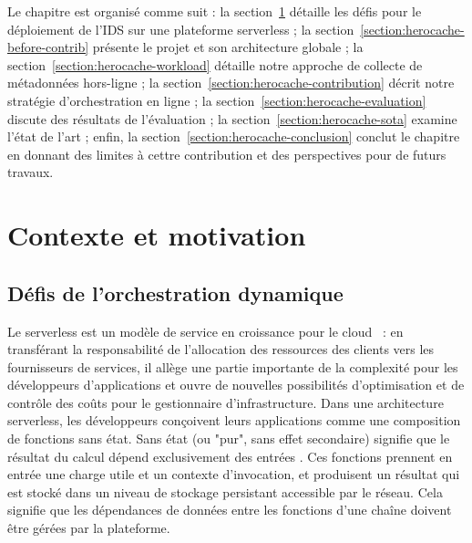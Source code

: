 Le chapitre est organisé comme suit : la section~\ref{section:herocache-background} détaille les défis pour le déploiement de l'IDS sur une plateforme serverless ; la section~\ref{section:herocache-before-contrib} présente le projet et son architecture globale ; la section~\ref{section:herocache-workload} détaille notre approche de collecte de métadonnées hors-ligne ; la section~\ref{section:herocache-contribution} décrit notre stratégie d'orchestration en ligne ; la section~\ref{section:herocache-evaluation} discute des résultats de l'évaluation ; la section~\ref{section:herocache-sota} examine l'état de l'art ; enfin, la section~\ref{section:herocache-conclusion} conclut le chapitre en donnant des limites à cettre contribution et des perspectives pour de futurs travaux.

\section{Contexte et motivation}
\label{section:herocache-background}

\subsection{Défis de l'orchestration dynamique}

Le serverless est un modèle de service en croissance pour le cloud~\cite{Lannurien2023} : en transférant la responsabilité de l'allocation des ressources des clients vers les fournisseurs de services, il allège une partie importante de la complexité pour les développeurs d'applications et ouvre de nouvelles possibilités d'optimisation et de contrôle des coûts pour le gestionnaire d'infrastructure. Dans une architecture serverless, les développeurs conçoivent leurs applications comme une composition de fonctions sans état. Sans état (ou "pur", sans effet secondaire) signifie que le résultat du calcul dépend exclusivement des entrées \cite{burckhardtNetheriteEfficientExecution}. Ces fonctions prennent en entrée une charge utile et un contexte d'invocation, et produisent un résultat qui est stocké dans un niveau de stockage persistant accessible par le réseau. Cela signifie que les dépendances de données entre les fonctions d'une chaîne doivent être gérées par la plateforme.

